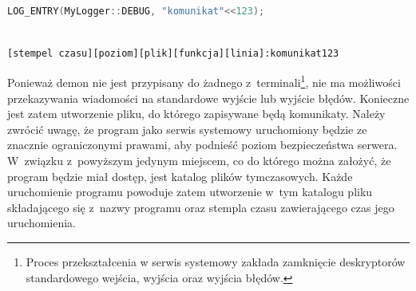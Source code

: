 \vspace{0.5cm}
\begin{minipage}{\textwidth}
  \begin{lstlisting}[language=c++, breaklines=true,
    linewidth=0.99\textwidth, caption=Przykładowe wypisanie
    komunikatu.]

LOG_ENTRY(MyLogger::DEBUG, "komunikat"<<123);

\end{lstlisting}
\end{minipage}
\vspace{0.5cm}

\vspace{0.5cm}
\begin{minipage}{\textwidth}
\begin{lstlisting}[linewidth=0.99\textwidth, caption=Format komunikatu przekazywanego użytkownikowi.]

[stempel czasu][poziom][plik][funkcja][linia]:komunikat123

\end{lstlisting}
\end{minipage}
\vspace{0.5cm}

Ponieważ demon nie jest przypisany do żadnego
z~terminali\footnote{Proces przekształcenia w serwis systemowy zakłada
  zamknięcie deskryptorów standardowego wejścia, wyjścia oraz wyjścia
  błędów.}, nie ma możliwości przekazywania wiadomości na standardowe
wyjście lub wyjście błędów. Konieczne jest zatem utworzenie pliku, do
którego zapisywane będą komunikaty. Należy zwrócić uwagę, że program
jako serwis systemowy uruchomiony będzie ze znacznie ograniczonymi
prawami, aby podnieść poziom bezpieczeństwa serwera. W~związku
z~powyższym jedynym miejscem, co do którego można założyć, że program
będzie miał dostęp, jest katalog plików tymczasowych. Każde
uruchomienie programu powoduje zatem utworzenie w~tym katalogu pliku
składającego się z~nazwy programu oraz stempla czasu zawierającego
czas jego uruchomienia.
